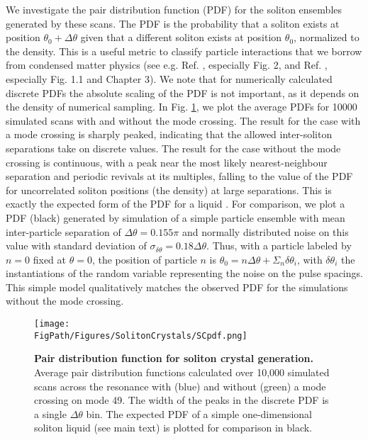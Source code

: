 We investigate the pair distribution function (PDF) for the soliton ensembles generated by these scans. The PDF is the probability that a soliton exists at position $\theta_0+\Delta\theta$ given that a different soliton exists at position $\theta_0$, normalized to the density. This is a useful metric to classify particle interactions that we borrow from condensed matter physics (see e.g. Ref. \cite{Barker1976}, especially Fig. 2, and Ref. \cite{Egami2012}, especially Fig. 1.1 and Chapter 3). We note that for numerically calculated discrete PDFs the absolute scaling of the PDF is not important, as it depends on the density of numerical sampling. In Fig. \ref{fig:SCpdf}, we plot the average PDFs for 10000 simulated scans with and without the mode crossing. The result for the case with a mode crossing is sharply peaked, indicating that the allowed inter-soliton separations take on discrete values. The result for the case without the mode crossing is continuous, with a peak near the most likely nearest-neighbour separation and periodic revivals at its multiples, falling to the value of the PDF for uncorrelated soliton positions (the density) at large separations. This is exactly the expected form of the PDF for a liquid \cite{Barker1976,Egami2012}. For comparison, we plot a PDF (black) generated by simulation of a simple particle ensemble with mean inter-particle separation of $\Delta\theta=0.155\pi$ and normally distributed noise on this value with standard deviation of $\sigma_{\delta\theta}=0.18\Delta\theta$. Thus, with a particle labeled by $n = 0$ fixed at $\theta = 0$, the position of particle $n$ is $\theta_0 = n\Delta\theta + \Sigma_n\delta\theta_i$, with $\delta\theta_i$ the instantiations of the random variable representing the noise on the pulse spacings. This simple model qualitatively matches the observed PDF for the simulations without the mode crossing.

\begin{figure}[htpb]
	\begin{center}
		\texttt{[image: \\FigPath/Figures/SolitonCrystals/SCpdf.png]}
	\end{center}
	\caption[Pair distribution function for soliton crystal generation]{\textbf{Pair distribution function for soliton crystal generation.} Average pair distribution functions calculated over 10,000 simulated scans across the resonance with (blue) and without (green) a mode crossing on mode 49. The width of the peaks in the discrete PDF is a single $\Delta\theta$ bin. The expected PDF of a simple one-dimensional soliton liquid (see main text) is plotted for comparison in black.}
	\label{fig:SCpdf}
\end{figure} 


